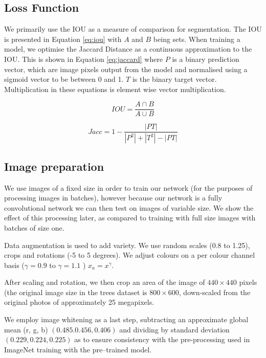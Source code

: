 \subsection {Loss Function}


We primarily use the \gls{IOU} as a measure of comparison for segmentation. The \gls{IOU} is presented in Equation \ref{eq:iou} with $ A $ and $ B $ being sets. When training a model, we optimise the Jaccard Distance as a continuous approximation to the \gls{IOU}. This is shown in Equation \ref{eq:jaccard} where $ P $ is a binary prediction vector, which are image pixels output from the model and normalised using a sigmoid vector to be between 0 and 1. $ T $ is the binary target vector. Multiplication in these equations is element wise vector multiplication.


\begin{equation}
IOU = \frac{A \cap B}{A \cup B}
\label{eq:iou}
\end{equation}


\begin{equation}
Jacc = 1 - \frac{| PT |}{| P^2 | + | T^2 | - | PT |}
\label{eq:jaccard}
\end{equation}



\subsection {Image preparation}

We use images of a fixed size in order to train our network (for the purposes of processing images in batches), however because our network is a fully convolutional network we can then test on images of variable size. We show the effect of this processing later, as compared to training with full size images with batches of size one.

Data augmentation is used to add variety. We use random scales (0.8 to 1.25), crops and rotations (-5 to 5 degrees). We adjust colours on a per colour channel basis ($ \gamma = 0.9 $ to $ \gamma=1.1 $ )  $ x_a = x^{\gamma} $.

After scaling and rotation, we then crop an area of the image of $440 \times 440$ pixels (the original image size in the trees dataset is $800 \times 600$, down-scaled from the original photos of approximately 25 megapixels.

We employ image whitening as a last step, subtracting an approximate global mean (r, g, b) $ (0.485. 0.456, 0.406) $ and dividing by standard deviation $ (0.229, 0.224, 0.225) $ as to ensure consistency with the pre-processing used in ImageNet training with the pre--trained model.



